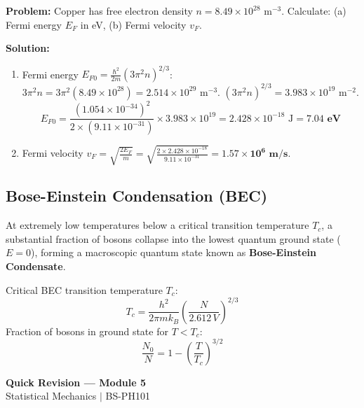 \documentclass[12pt,a4paper]{article}
\begin{document}
\begin{tcolorbox}[examplebox, title={\textbf{Solved Problem 2: Fermi Energy of Copper}}]
\textbf{Problem:} Copper has free electron density $n = 8.49 \times 10^{28}\text{ m}^{-3}$. Calculate: (a) Fermi energy $E_F$ in eV, (b) Fermi velocity $v_F$.

\textbf{Solution:}\par\noindent
\begin{enumerate}[leftmargin=*, itemsep=2pt]
  \item Fermi energy $E_{F0} = \frac{\hbar^2}{2m} (3\pi^2 n)^{2/3}$:
   $3\pi^2 n = 3 \pi^2 (8.49 \times 10^{28}) = 2.514 \times 10^{29}\text{ m}^{-3}$.
   $(3\pi^2 n)^{2/3} = 3.983 \times 10^{19}\text{ m}^{-2}$.
   \begin{equation}
   E_{F0} = \frac{(1.054 \times 10^{-34})^2}{2 \times (9.11 \times 10^{-31})} \times 3.983 \times 10^{19} = 2.428 \times 10^{-18}\text{ J} = \mathbf{7.04\text{ eV}}
   \end{equation}
  \item Fermi velocity $v_F = \sqrt{\frac{2 E_F}{m}} = \sqrt{\frac{2 \times 2.428 \times 10^{-18}}{9.11 \times 10^{-31}}} = \mathbf{1.57 \times 10^6\text{ m/s}}$.
\end{enumerate}
\end{tcolorbox}

\subsection{Bose-Einstein Condensation (BEC)}

At extremely low temperatures below a critical transition temperature $T_c$, a substantial fraction of bosons collapse into the lowest quantum ground state ($E=0$), forming a macroscopic quantum state known as \textbf{Bose-Einstein Condensate}.

\begin{tcolorbox}[formulabox, title={\textbf{Critical Temperature and Ground State Fraction}}]
Critical BEC transition temperature $T_c$:
\begin{equation}
T_c = \frac{h^2}{2\pi m k_B} \left( \frac{N}{2.612 \, V} \right)^{2/3}
\end{equation}
Fraction of bosons in ground state for $T < T_c$:
\begin{equation}
\frac{N_0}{N} = 1 - \left(\frac{T}{T_c}\right)^{3/2}
\end{equation}
\end{tcolorbox}

\newpage
\begin{center}
  {\large\bfseries\color{myred} Quick Revision --- Module 5}\\[3pt]
  {\small\color{mydark} Statistical Mechanics $|$ BS-PH101}
\end{center}
\noindent{\color{myred}\rule{\linewidth}{1.2pt}}
\vspace{4pt}
\end{document}
